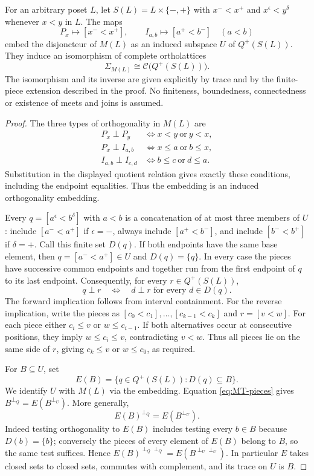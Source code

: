 \begin{theorem}
\label{SA21-A26}
For an arbitrary poset $L$, let $S(L)=L\times\{-,+\}$ with
$x^-<x^+$ and $x^\epsilon<y^\delta$ whenever $x<y$ in $L$.
The maps
\[
 P_x\longmapsto[x^-<x^+],\qquad
 I_{a,b}\longmapsto[a^+<b^-]\quad(a<b)
\]
embed the disjoncteur of $M(L)$ as an induced subspace $U$ of
$Q^+(S(L))$. They induce an isomorphism of complete ortholattices
\[
 \Sigma_{M(L)}\cong\mathcal C\bigl(Q^+(S(L))\bigr).
\]
The isomorphism and its inverse are given explicitly by trace and by
the finite-piece extension described in the proof. No finiteness,
boundedness, connectedness or existence of meets and joins is assumed.
\end{theorem}
\begin{proof}
The three types of orthogonality in $M(L)$ are
\begin{align*}
 P_x\perp P_y&\iff x<y\ \text{or}\ y<x,\\
 P_x\perp I_{a,b}&\iff x\le a\ \text{or}\ b\le x,\\
 I_{a,b}\perp I_{c,d}&\iff b\le c\ \text{or}\ d\le a.
\end{align*}
Substitution in the displayed quotient relation gives exactly these
conditions, including the endpoint equalities. Thus the embedding is
an induced orthogonality embedding.

Every $q=[a^\epsilon<b^\delta]$ with $a<b$ is a concatenation of
at most three members of $U$: include $[a^-<a^+]$ if $\epsilon=-$,
always include $[a^+<b^-]$, and include $[b^-<b^+]$ if $\delta=+$.
Call this finite set $D(q)$. If both endpoints have the same base
element, then $q=[a^-<a^+]\in U$ and $D(q)=\{q\}$.
In every case the pieces have successive common endpoints and together
run from the first endpoint of $q$ to its last endpoint. Consequently,
for every $r\in Q^+(S(L))$,
\begin{equation}
 \label{eq:MT-pieces}
 q\perp r\quad\Longleftrightarrow\quad
 d\perp r\text{ for every }d\in D(q).
\end{equation}
The forward implication follows from interval containment. For the
reverse implication, write the pieces as
$[c_0<c_1],\ldots,[c_{k-1}<c_k]$ and $r=[v<w]$.
For each piece either $c_i\le v$ or $w\le c_{i-1}$.
If both alternatives occur at consecutive positions, they imply
$w\le c_i\le v$, contradicting $v<w$. Thus all pieces lie on the
same side of $r$, giving $c_k\le v$ or $w\le c_0$, as required.

For $B\subseteq U$, set
\[
 E(B)=\{q\in Q^+(S(L)):D(q)\subseteq B\}.
\]
We identify $U$ with $M(L)$ via the embedding. Equation
\eqref{eq:MT-pieces} gives
$B^{\perp_{Q}}=E(B^{\perp_U})$.
More generally,
\[
 E(B)^{\perp_Q}=E(B^{\perp_U}).
\]
Indeed testing orthogonality to $E(B)$ includes testing every $b\in B$
because $D(b)=\{b\}$; conversely the pieces of every element of
$E(B)$ belong to $B$, so the same test suffices. Hence
$E(B)^{\perp_Q\perp_Q}=E(B^{\perp_U\perp_U})$.
In particular $E$ takes closed sets to closed sets, commutes with
complement, and its trace on $U$ is $B$.


\end{proof}
